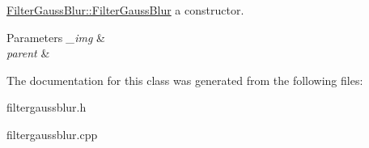 \mbox{\hyperlink{class_filter_gauss_blur_a0c68d0050dd01a12f41452fd11f9b5d4}{Filter\+Gauss\+Blur\+::\+Filter\+Gauss\+Blur}} a constructor. 


\begin{DoxyParams}{Parameters}
{\em \+\_\+img} & \\
\hline
{\em parent} & \\
\hline
\end{DoxyParams}


The documentation for this class was generated from the following files\+:\begin{DoxyCompactItemize}
\item 
filtergaussblur.\+h\item 
filtergaussblur.\+cpp\end{DoxyCompactItemize}
